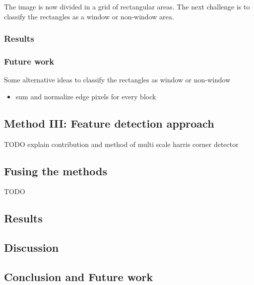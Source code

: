 The image is now divided in a grid of rectangular areas. The next challenge is to 
classify the rectangles as a window or non-window area.


\subsubsection{Results}

\subsubsection{Future work}
Some alternative ideas to classify the rectangles as window or non-window
\begin{itemize}
	\item sum and normalize edge pixels for every block 
\end{itemize}


\subsection{Method III: Feature detection approach}
	TODO explain contribution and method of multi scale harris corner detector

\subsection{Fusing the methods}
	TODO

\subsection{Results}
\subsection{Discussion}  %
\subsection{Conclusion and Future work}




% 
% 
% 
% 
% 
% 
% 
% 
